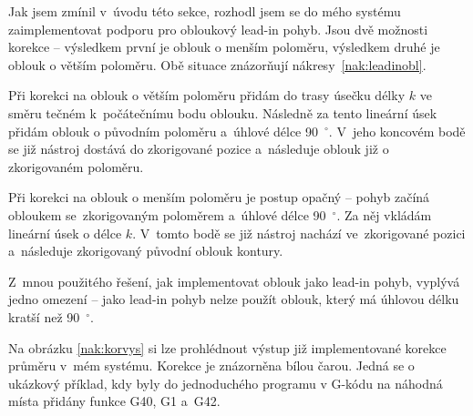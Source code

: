 			Jak jsem zmínil v~úvodu této sekce, rozhodl jsem se do mého systému zaimplementovat podporu pro obloukový lead-in pohyb. Jsou dvě možnosti korekce -- výsledkem první je oblouk o menším poloměru, výsledkem druhé je oblouk o větším poloměru. Obě situace znázorňují nákresy~\ref{nak:leadinobl}.
			
			Při korekci na oblouk o větším poloměru přidám do trasy úsečku délky $k$ ve směru tečném k~počátečnímu bodu oblouku. Následně za tento lineární úsek přidám oblouk o původním poloměru a~úhlové délce 90~$^\circ$. V~jeho koncovém bodě se již nástroj dostává do zkorigované pozice a~následuje oblouk již o zkorigovaném poloměru.
			
			Při korekci na oblouk o menším poloměru je postup opačný -- pohyb začíná obloukem se~zkorigovaným poloměrem a~úhlové délce 90~$^\circ$. Za něj vkládám lineární úsek o délce $k$. V~tomto bodě se již nástroj nachází ve~zkorigované pozici a~následuje zkorigovaný původní oblouk kontury.
			
			Z~mnou použitého řešení, jak implementovat oblouk jako lead-in pohyb, vyplývá jedno omezení -- jako lead-in pohyb nelze použít oblouk, který má úhlovou délku kratší než 90~$^\circ$.
			
			
			Na obrázku \ref{nak:korvys} si lze prohlédnout výstup již implementované korekce průměru v~mém systému. Korekce je znázorněna bílou čarou. Jedná se o ukázkový příklad, kdy byly do jednoduchého programu v G-kódu na náhodná místa přidány funkce G40, G1 a~G42.
			

